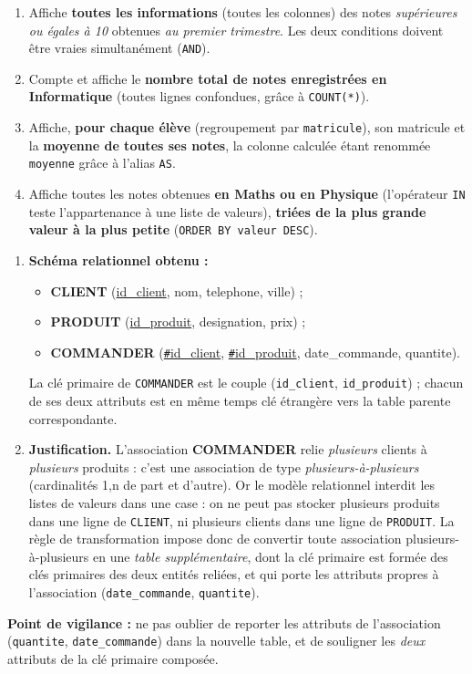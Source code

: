 \documentclass[11pt]{article}
\begin{document}
\begin{corrige}
\begin{enumerate}
\item Affiche \textbf{toutes les informations} (toutes les colonnes) des notes \emph{supérieures ou égales à 10} obtenues \emph{au premier trimestre}. Les deux conditions doivent être vraies simultanément (\texttt{AND}).
\item Compte et affiche le \textbf{nombre total de notes enregistrées en Informatique} (toutes lignes confondues, grâce à \texttt{COUNT(*)}).
\item Affiche, \textbf{pour chaque élève} (regroupement par \texttt{matricule}), son matricule et la \textbf{moyenne de toutes ses notes}, la colonne calculée étant renommée \texttt{moyenne} grâce à l'alias \texttt{AS}.
\item Affiche toutes les notes obtenues \textbf{en Maths ou en Physique} (l'opérateur \texttt{IN} teste l'appartenance à une liste de valeurs), \textbf{triées de la plus grande valeur à la plus petite} (\texttt{ORDER BY valeur DESC}).
\end{enumerate}
\end{corrige}

\begin{corrige}
\begin{enumerate}
\item \textbf{Schéma relationnel obtenu :}
\begin{itemize}
\item \textbf{CLIENT} (\underline{id\_client}, nom, telephone, ville) ;
\item \textbf{PRODUIT} (\underline{id\_produit}, designation, prix) ;
\item \textbf{COMMANDER} (\underline{\texttt{\#}id\_client}, \underline{\texttt{\#}id\_produit}, date\_commande, quantite).
\end{itemize}
La clé primaire de \texttt{COMMANDER} est le couple (\texttt{id\_client}, \texttt{id\_produit}) ; chacun de ses deux attributs est en même temps clé étrangère vers la table parente correspondante.
\item \textbf{Justification.} L'association \textbf{COMMANDER} relie \emph{plusieurs} clients à \emph{plusieurs} produits : c'est une association de type \emph{plusieurs-à-plusieurs} (cardinalités 1,n de part et d'autre). Or le modèle relationnel interdit les listes de valeurs dans une case : on ne peut pas stocker plusieurs produits dans une ligne de \texttt{CLIENT}, ni plusieurs clients dans une ligne de \texttt{PRODUIT}. La règle de transformation impose donc de convertir toute association plusieurs-à-plusieurs en une \emph{table supplémentaire}, dont la clé primaire est formée des clés primaires des deux entités reliées, et qui porte les attributs propres à l'association (\texttt{date\_commande}, \texttt{quantite}).
\end{enumerate}
\textbf{Point de vigilance :} ne pas oublier de reporter les attributs de l'association (\texttt{quantite}, \texttt{date\_commande}) dans la nouvelle table, et de souligner les \emph{deux} attributs de la clé primaire composée.
\end{corrige}
\end{document}
